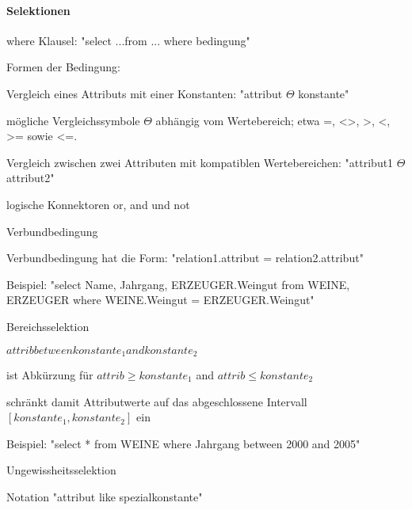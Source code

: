 \documentclass[a4paper]{article}
\begin{document}
\begin{multicols}{3}
\paragraph{Selektionen}
\begin{itemize*}
    \item where Klausel: "select ...from ... where bedingung"
    \begin{itemize*}
        \item Formen der Bedingung:
        \begin{itemize*}
            \item Vergleich eines Attributs mit einer Konstanten: "attribut $\Theta$ konstante"
            \item mögliche Vergleichssymbole $\Theta$ abhängig vom Wertebereich; etwa =, <>, >, <, >= sowie <=.
            \item Vergleich zwischen zwei Attributen mit kompatiblen Wertebereichen: "attribut1 $\Theta$ attribut2"
            \item logische Konnektoren or, and und not
        \end{itemize*}
    \end{itemize*}
    \item Verbundbedingung
    \begin{itemize*}
        \item Verbundbedingung hat die Form: "relation1.attribut = relation2.attribut"
        \item Beispiel: "select Name, Jahrgang, ERZEUGER.Weingut from WEINE, ERZEUGER where WEINE.Weingut = ERZEUGER.Weingut"
    \end{itemize*}
    \item Bereichsselektion
    \begin{itemize*}
        \item $attrib between konstante_1 and konstante_2$
        \item ist Abkürzung für $attrib \geq konstante_1$ and $attrib \leq konstante_2$
        \item schränkt damit Attributwerte auf das abgeschlossene Intervall $[konstante_1 , konstante_2 ]$ ein
        \item Beispiel: "select * from WEINE where Jahrgang between 2000 and 2005"
    \end{itemize*}
    \item Ungewissheitsselektion
    \begin{itemize*}
        \item Notation "attribut like spezialkonstante"

\end{itemize*}
\end{itemize*}
\end{multicols}
\end{document}
